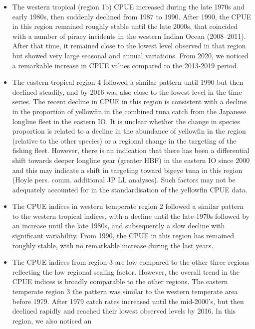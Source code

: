 \documentclass[
]{scrartcl}
\begin{document}
\begin{itemize}
\item
  The western tropical (region 1b) CPUE increased during the late 1970s
  and early 1980s, then suddenly declined from 1987 to 1990. After 1990,
  the CPUE in this region remained roughly stable until the late 2000s,
  that coincided with a number of piracy incidents in the western Indian
  Ocean (2008--2011). After that time, it remained close to the lowest
  level observed in that region but showed very large seasonal and
  annual variations. From 2020, we noticed a remarkable increase in CPUE
  values compared to the 2013-2019 period.
\item
  The eastern tropical region 4 followed a similar pattern until 1990
  but then declined steadily, and by 2016 was also close to the lowest
  level in the time series. The recent decline in CPUE in this region is
  consistent with a decline in the proportion of yellowfin in the
  combined tuna catch from the Japanese longline fleet in the eastern
  IO. It is unclear whether the change in species proportion is related
  to a decline in the abundance of yellowfin in the region (relative to
  the other species) or a regional change in the targeting of the
  fishing fleet. However, there is an indication that there has been a
  differential shift towards deeper longline gear (greater HBF) in the
  eastern IO since 2000 and this may indicate a shift in targeting
  toward bigeye tuna in this region (Hoyle pers. comm. additional JP LL
  analyses). Such factors may not be adequately accounted for in the
  standardisation of the yellowfin CPUE data.
\item
  The CPUE indices in western temperate region 2 followed a similar
  pattern to the western tropical indices, with a decline until the
  late-1970s followed by an increase until the late 1980s, and
  subsequently a slow decline with significant variability. From 1990,
  the CPUE in this region has remained roughly stable, with no
  remarkable increase during the last years.
\item
  The CPUE indices from region 3 are low compared to the other three
  regions reflecting the low regional scaling factor. However, the
  overall trend in the CPUE indices is broadly comparable to the other
  regions. The eastern temperate region 3 the pattern was similar to the
  western temperate area before 1979. After 1979 catch rates increased
  until the mid-2000's, but then declined rapidly and reached their
  lowest observed levels by 2016. In this region, we also noticed an

\end{itemize}
\end{document}
